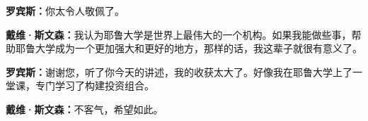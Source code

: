 \begin{BookQuote}
\textbf{罗宾斯：}你太令人敬佩了。
\end{BookQuote}

\begin{BookQuote}
\textbf{戴维·斯文森：}我认为耶鲁大学是世界上最伟大的一个机构。如果我能做些事，帮助耶鲁大学成为一个更加强大和更好的地方，那样的话，我这辈子就很有意义了。
\end{BookQuote}

\begin{BookQuote}
\textbf{罗宾斯：}谢谢您，听了你今天的讲述，我的收获太大了。好像我在耶鲁大学上了一堂课，专门学习了构建投资组合。
\end{BookQuote}

\begin{BookQuote}
\textbf{戴维·斯文森：}不客气，希望如此。
\end{BookQuote}
